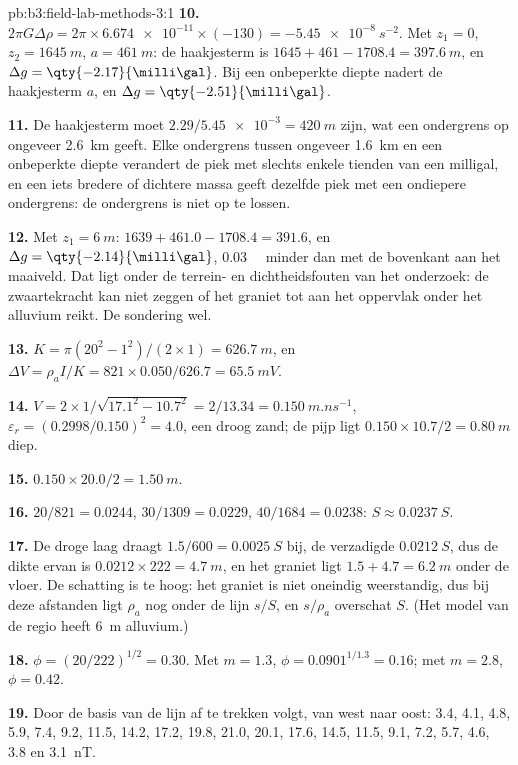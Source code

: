 \begin{solution}{pb:b3:field-lab-methods-3:1}
\textbf{10.} $2\pi G\Delta\rho = 2\pi\times\num{6.674e-11}\times(-130) =
\qty{-5.45e-8}{s^{-2}}$. Met $z_1 = 0$, $z_2 = \qty{1645}{m}$, $a =
\qty{461}{m}$: de haakjesterm is $1645 + 461 - 1708.4 = \qty{397.6}{m}$,
en $\Delta g = \qty{-2.17}{\milli\gal}$. Bij een onbeperkte diepte nadert de
haakjesterm $a$, en $\Delta g = \qty{-2.51}{\milli\gal}$.

\textbf{11.} De haakjesterm moet $2.29/\num{5.45e-3} = \qty{420}{m}$ zijn, wat een
ondergrens op ongeveer \qty{2.6}{km} geeft. Elke ondergrens tussen ongeveer
\qty{1.6}{km} en een onbeperkte diepte verandert de piek met slechts enkele tienden
van een milligal, en een iets bredere of dichtere massa geeft dezelfde piek met
een ondiepere ondergrens: de ondergrens is niet op te lossen.

\textbf{12.} Met $z_1 = \qty{6}{m}$: $1639 + 461.0 - 1708.4 = 391.6$, en
$\Delta g = \qty{-2.14}{\milli\gal}$, \qty{0.03}{\milli\gal} minder dan
met de bovenkant aan het maaiveld. Dat ligt onder de terrein- en
dichtheidsfouten van het onderzoek: de zwaartekracht kan niet zeggen of het graniet
tot aan het oppervlak onder het alluvium reikt. De sondering wel.

\textbf{13.} $K = \pi(20^2 - 1^2)/(2\times1) = \qty{626.7}{m}$, en $\Delta V =
\rho_a I/K = 821\times0.050/626.7 = \qty{65.5}{mV}$.

\textbf{14.} $V = 2\times1/\sqrt{17.1^2 - 10.7^2} = 2/13.34 =
\qty{0.150}{m.ns^{-1}}$, $\varepsilon_r = (0.2998/0.150)^2 = 4.0$, een
droog zand; de pijp ligt $0.150\times10.7/2 = \qty{0.80}{m}$ diep.

\textbf{15.} $0.150\times20.0/2 = \qty{1.50}{m}$.

\textbf{16.} $20/821 = \num{0.0244}$, $30/1309 = \num{0.0229}$, $40/1684 =
\num{0.0238}$: $S \approx \qty{0.0237}{S}$.

\textbf{17.} De droge laag draagt $1.5/600 = \qty{0.0025}{S}$ bij, de
verzadigde $\qty{0.0212}{S}$, dus de dikte ervan is $0.0212\times222 =
\qty{4.7}{m}$, en het graniet ligt $1.5 + 4.7 = \qty{6.2}{m}$ onder de
vloer. De schatting is te hoog: het graniet is niet oneindig
weerstandig, dus bij deze afstanden ligt $\rho_a$ nog onder de lijn
$s/S$, en $s/\rho_a$ overschat $S$. (Het model van de regio heeft
\qty{6}{m} alluvium.)

\textbf{18.} $\phi = (20/222)^{1/2} = \num{0.30}$. Met $m = 1.3$, $\phi =
0.0901^{1/1.3} = \num{0.16}$; met $m = 2.8$, $\phi = \num{0.42}$.

\textbf{19.} Door de basis van de lijn af te trekken volgt, van west naar oost:
3.4, 4.1, 4.8, 5.9, 7.4, 9.2, 11.5, 14.2, 17.2, 19.8, 21.0, 20.1, 17.6,
14.5, 11.5, 9.1, 7.2, 5.7, 4.6, 3.8 en \qty{3.1}{nT}.


\end{solution}
